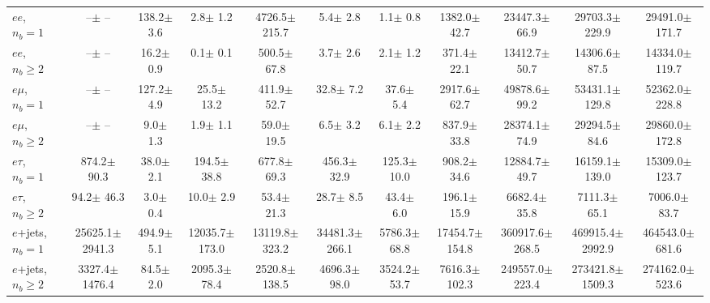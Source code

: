 \begin{tabular}{l|cccccccc|cc}
    \hline
    $e e$, $n_b=1$                     &       --$\pm$     -- &    138.2$\pm$    3.6 &      2.8$\pm$    1.2 &   4726.5$\pm$  215.7 &      5.4$\pm$    2.8 &      1.1$\pm$    0.8 &   1382.0$\pm$   42.7 &  23447.3$\pm$   66.9 &  29703.3$\pm$  229.9 &  29491.0$\pm$  171.7 \\ 
    $e e$, $n_b\geq2$                  &       --$\pm$     -- &     16.2$\pm$    0.9 &      0.1$\pm$    0.1 &    500.5$\pm$   67.8 &      3.7$\pm$    2.6 &      2.1$\pm$    1.2 &    371.4$\pm$   22.1 &  13412.7$\pm$   50.7 &  14306.6$\pm$   87.5 &  14334.0$\pm$  119.7 \\ 
    \hline
    $e\mu$, $n_b=1$                    &       --$\pm$     -- &    127.2$\pm$    4.9 &     25.5$\pm$   13.2 &    411.9$\pm$   52.7 &     32.8$\pm$    7.2 &     37.6$\pm$    5.4 &   2917.6$\pm$   62.7 &  49878.6$\pm$   99.2 &  53431.1$\pm$  129.8 &  52362.0$\pm$  228.8 \\ 
    $e\mu$, $n_b\geq2$                 &       --$\pm$     -- &      9.0$\pm$    1.3 &      1.9$\pm$    1.1 &     59.0$\pm$   19.5 &      6.5$\pm$    3.2 &      6.1$\pm$    2.2 &    837.9$\pm$   33.8 &  28374.1$\pm$   74.9 &  29294.5$\pm$   84.6 &  29860.0$\pm$  172.8 \\ 
    \hline
    $e\tau$, $n_b=1$                   &    874.2$\pm$   90.3 &     38.0$\pm$    2.1 &    194.5$\pm$   38.8 &    677.8$\pm$   69.3 &    456.3$\pm$   32.9 &    125.3$\pm$   10.0 &    908.2$\pm$   34.6 &  12884.7$\pm$   49.7 &  16159.1$\pm$  139.0 &  15309.0$\pm$  123.7 \\ 
    $e\tau$, $n_b\geq2$                &     94.2$\pm$   46.3 &      3.0$\pm$    0.4 &     10.0$\pm$    2.9 &     53.4$\pm$   21.3 &     28.7$\pm$    8.5 &     43.4$\pm$    6.0 &    196.1$\pm$   15.9 &   6682.4$\pm$   35.8 &   7111.3$\pm$   65.1 &   7006.0$\pm$   83.7 \\ 
    \hline
    $e$+jets, $n_b=1$                  &  25625.1$\pm$ 2941.3 &    494.9$\pm$    5.1 &  12035.7$\pm$  173.0 &  13119.8$\pm$  323.2 &  34481.3$\pm$  266.1 &   5786.3$\pm$   68.8 &  17454.7$\pm$  154.8 & 360917.6$\pm$  268.5 & 469915.4$\pm$ 2992.9 & 464543.0$\pm$  681.6 \\ 
    $e$+jets, $n_b\geq2$               &   3327.4$\pm$ 1476.4 &     84.5$\pm$    2.0 &   2095.3$\pm$   78.4 &   2520.8$\pm$  138.5 &   4696.3$\pm$   98.0 &   3524.2$\pm$   53.7 &   7616.3$\pm$  102.3 & 249557.0$\pm$  223.4 & 273421.8$\pm$ 1509.3 & 274162.0$\pm$  523.6 \\ 
    \hline

    \end{tabular}